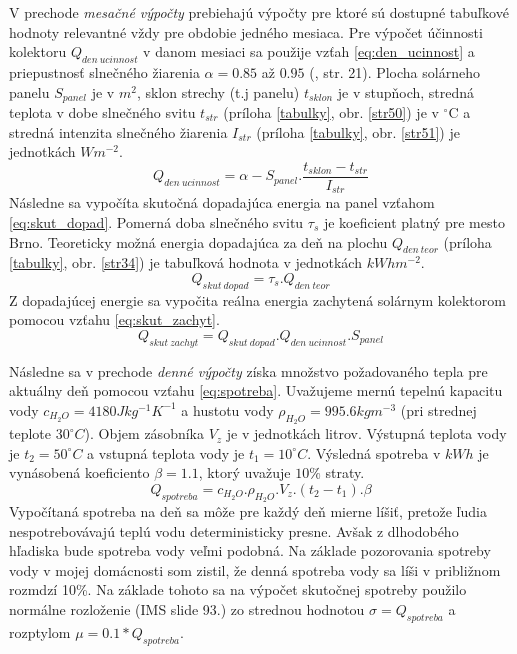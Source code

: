 \documentclass[a4paper, 11pt]{article}
\begin{document}
V prechode \textit{mesačné výpočty} prebiehajú výpočty pre ktoré sú dostupné tabuľkové hodnoty relevantné vždy pre obdobie jedného mesiaca. Pre výpočet účinnosti kolektoru  $Q_{den\ ucinnost}$ v danom mesiaci sa použije vzťah \ref{eq:den_ucinnost} a priepustnosť slnečného žiarenia $\alpha=0.85$ až $0.95$ (\cite{bc_solar_system}, str. 21). Plocha solárneho panelu $S_{panel}$  je v $m^2$, sklon strechy (t.j panelu) $t_{sklon}$ je v stupňoch, stredná teplota v dobe slnečného svitu $t_{str}$ (príloha \ref{tabulky}, obr. \ref{str50}) je v $^{\circ}$C a stredná intenzita slnečného žiarenia $I_{str}$ (príloha \ref{tabulky}, obr. \ref{str51}) je jednotkách $Wm^{-2}$.
\begin{equation}\label{eq:den_ucinnost}
Q_{den\ ucinnost} = \alpha - S_{panel} . \frac{t_{sklon} - t_{str}}{I_{str}}
\end{equation}
Následne sa vypočíta skutočná dopadajúca energia na panel vzťahom \ref{eq:skut_dopad}. Pomerná doba slnečného svitu $\tau_s$ je koeficient platný pre mesto Brno. Teoreticky možná energia dopadajúca za deň na plochu $Q_{den\ teor}$ (príloha \ref{tabulky}, obr. \ref{str34}) je tabuľková hodnota v jednotkách $kWhm^{-2}$.
\begin{equation}\label{eq:skut_dopad}
Q_{skut\ dopad} = \tau_s . Q_{den\ teor}
\end{equation}
Z dopadajúcej energie sa vypočita reálna energia zachytená solárnym kolektorom pomocou vzťahu \ref{eq:skut_zachyt}.
\begin{equation}\label{eq:skut_zachyt}
Q_{skut\ zachyt} = Q_{skut\ dopad} . Q_{den\ ucinnost} . S_{panel}
\end{equation}

Následne sa v prechode \textit{denné výpočty} získa množstvo požadovaného tepla pre aktuálny deň pomocou vzťahu \ref{eq:spotreba}. Uvažujeme mernú tepelnú kapacitu vody $c_{H_2O}=4180 Jkg^{-1}K^{-1}$ a hustotu vody $\rho_{H_2O} = 995.6kgm^{-3}$ (pri strednej teplote $30^{\circ}C$). Objem zásobníka $V_z$ je v jednotkách litrov. Výstupná teplota vody je $t_2 = 50^{\circ}C$ a vstupná teplota vody je $t_1 = 10^{\circ}C$. Výsledná spotreba v $kWh$ je vynásobená koeficiento $\beta = 1.1$, ktorý uvažuje $10\%$ straty.
\begin{equation}\label{eq:spotreba}
Q_{spotreba} = c_{H_2O} . \rho_{H_2O} . V_z . (t_2 - t_1) . \beta
\end{equation}
Vypočítaná spotreba na deň sa môže pre každý deň mierne líšiť, pretože ľudia nespotrebovávajú teplú vodu deterministicky presne. Avšak z dlhodobého hľadiska bude spotreba vody veľmi podobná. Na základe pozorovania spotreby vody v mojej domácnosti som zistil, že denná spotreba vody sa líši v približnom rozmdzí 10\%. Na základe tohoto sa na výpočet skutočnej spotreby použilo normálne rozloženie (IMS\cite{ims_slides} slide 93.) zo strednou hodnotou $\sigma=Q_{spotreba}$ a rozptylom $\mu=0.1*Q_{spotreba}$.
\end{document}

